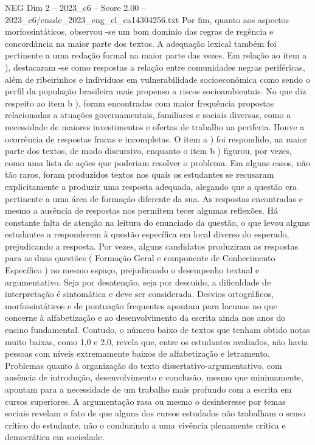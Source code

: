 \begin{textsample}{NEG Dim 2 – 2023\_c6 – Score 2.00 – 2023\_c6/enade\_2023\_eng\_el\_ca14304256.txt}
Por fim, quanto aos aspectos morfossintáticos, observou -se um bom domínio das regras de regência e concordância na maior parte dos textos.
A adequação lexical também foi pertinente a uma redação formal na maior parte das vezes.
Em relação ao item a ), destacaram -se como respostas a relação entre comunidades negras periféricas, além de ribeirinhos e indivíduos em vulnerabilidade socioeconômica como sendo o perfil da população brasileira mais propenso a riscos socioambientais.
No que diz respeito ao item b ), foram encontradas com maior frequência propostas relacionadas a atuações governamentais, familiares e sociais diversas, como a necessidade de maiores investimentos e ofertas de trabalho na periferia.
Houve a ocorrência de respostas fracas e incompletas.
O item a ) foi respondido, na maior parte dos textos, de modo discursivo, enquanto o item b ) figurou, por vezes, como uma lista de ações que poderiam resolver o problema.
Em alguns casos, não tão raros, foram produzidos textos nos quais os estudantes se recusaram explicitamente a produzir uma resposta adequada, alegando que a questão era pertinente a uma área de formação diferente da sua.
As respostas encontradas e mesmo a ausência de respostas nos permitem tecer algumas reflexões.
Há constante falta de atenção na leitura do enunciado da questão, o que levou alguns estudantes a responderem à questão específica em local diverso do esperado, prejudicando a resposta.
Por vezes, alguns candidatos produziram as respostas para as duas questões ( Formação Geral e componente de Conhecimento Específico ) no mesmo espaço, prejudicando o desempenho textual e argumentativo.
Seja por desatenção, seja por descuido, a dificuldade de interpretação é sintomática e deve ser considerada.
Desvios ortográficos, morfossintáticos e de pontuação frequentes apontam para lacunas no que concerne à alfabetização e ao desenvolvimento da escrita ainda nos anos do ensino fundamental.
Contudo, o número baixo de textos que tenham obtido notas muito baixas, como 1,0 e 2,0, revela que, entre os estudantes avaliados, não havia pessoas com níveis extremamente baixos de alfabetização e letramento.
Problemas quanto à organização do texto dissertativo-argumentativo, com ausência de introdução, desenvolvimento e conclusão, mesmo que minimamente, apontam para a necessidade de um trabalho mais profundo com a escrita em cursos superiores.
A argumentação rasa ou mesmo o desinteresse por temas sociais revelam o fato de que alguns dos cursos estudados não trabalham o senso crítico do estudante, não o conduzindo a uma vivência plenamente crítica e democrática em sociedade.

\end{textsample}
